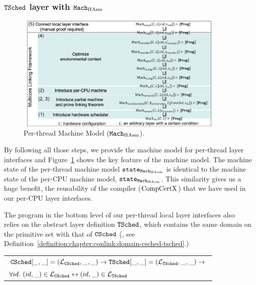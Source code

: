 \subsubsection{${{\mathrm{\texttt{TSched}}}}$ layer with ${\mathrm{\texttt{Mach}}}_{\mathrm{HAsm}}$} 



\begin{figure}
\begin{center}
\includegraphics[width=0.9\textwidth, page=9]{figs/conlink/concurrent_linking}
\end{center}
\caption{Per-thread Machine Model (${\mathrm{\texttt{Mach}}}_{\mathrm{HAsm}}$).}
\label{fig:chapter:conlink:per-thread-machine-model}
\end{figure}

By following all those steps, 
we provide the machine model for per-thread layer interfaces
and  Figure~\ref{fig:chapter:conlink:per-thread-machine-model} shows 
the key feature of the machine model.
The machine state of the per-thread machine model ${\mathrm{\texttt{state}}}_{{\mathrm{\texttt{Mach}}}_{\mathrm{HAsm}}}$ is identical
 to the machine state of the per-CPU machine model, ${\mathrm{\texttt{state}}}_{{\mathrm{\texttt{Mach}}}_{\mathrm{HAsm}}}$.
This similarity gives us a huge benefit, the reusability of the compiler ($\mathrm{CompCertX}$) 
that we have used in our per-CPU layer interfaces. 

The program in the bottom level of our per-thread local layer interfaces also relies on 
the abstract layer definition ${{\mathrm{\texttt{TSched}}}}$,
which contains the same domain on the primitive set with that of ${{\mathrm{\texttt{CSched}}}}$ (\ie, see Definition~\ref{definition:chapter:conlink:domain-csched-tsched}.)

\begin{definition}
\label{definition:chapter:conlink:domain-csched-tsched}
\begin{tabular}{P{0.95\textwidth}}
${{\mathrm{\texttt{CSched}}}}[\_, \_] = (\mathcal{L}_{{{\mathrm{\texttt{CSched}}}}}, \_ , \_) \rightarrow {{\mathrm{\texttt{TSched}}}}[\_, \_] = (\mathcal{L}_{{{\mathrm{\texttt{TSched}}}}}, \_ , \_) \rightarrow$\\
$\forall id.\ (id, \_) \in \Layer_{\CSched}  \leftrightarrow (id, \_) \in \Layer_{\TSched} $\\
\end{tabular}
\end{definition}

